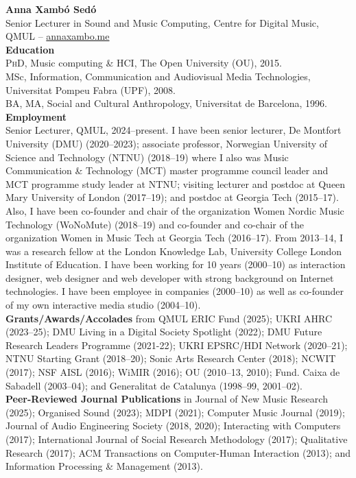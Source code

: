 \documentclass[10pt, a4paper]{article}
\begin{document}

{\textbf{Anna Xambó Sedó}}\\ 
Senior Lecturer in Sound and Music Computing, Centre for Digital Music, QMUL -- \href{https://annaxambo.me/}{annaxambo.me}\\

{\textbf{Education}}\\
\textsc{PhD}, Music computing \& HCI, The Open University (OU), 2015.\\
MSc, Information, Communication and Audiovisual Media Technologies, Universitat Pompeu Fabra (UPF), 2008.\\
BA, MA, Social and Cultural Anthropology, Universitat de Barcelona, 1996.\\

{\textbf{Employment}}\\
Senior Lecturer, QMUL, 2024--present. I have been senior lecturer, De Montfort University (DMU) (2020--2023); associate professor, Norwegian University of Science and Technology (NTNU) (2018--19) where I also was Music Communication \& Technology (MCT) master programme council leader and MCT programme study leader at NTNU; visiting lecturer and postdoc at Queen Mary University of London (2017--19); and postdoc at Georgia Tech (2015--17). Also, I have been co-founder and chair of the organization Women Nordic Music Technology (WoNoMute) (2018--19) and co-founder and co-chair of the organization Women in Music Tech at Georgia Tech (2016--17). From 2013--14, I was a research fellow at the London Knowledge Lab, University College London Institute of Education.
I have been working for 10 years (2000--10) as interaction designer, web designer and web developer with strong background on Internet technologies. I have been employee in companies (2000--10) as well as co-founder of my own interactive media studio (2004--10).\\

{\textbf{Grants/Awards/Accolades}} from QMUL ERIC Fund (2025); UKRI AHRC (2023--25); DMU Living in a Digital Society Spotlight (2022); DMU Future Research Leaders Programme (2021-22); UKRI EPSRC/HDI Network (2020--21); NTNU Starting Grant (2018--20); Sonic Arts Research Center (2018); NCWIT (2017); NSF AISL (2016); WiMIR (2016); OU (2010--13, 2010); Fund. Caixa de Sabadell (2003--04); and Generalitat de Catalunya (1998--99, 2001--02).\\

{\textbf{Peer-Reviewed Journal Publications}} in Journal of New Music Research (2025); Organised Sound (2023); MDPI (2021); Computer Music Journal (2019); Journal of Audio Engineering Society (2018, 2020); Interacting with Computers (2017); International Journal of Social Research Methodology (2017); Qualitative Research (2017); ACM Transactions on Computer-Human Interaction (2013); and Information Processing \& Management (2013).\\
\end{document}
